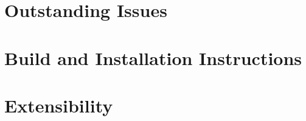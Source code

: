 \documentclass{article}
\begin{document}
\section{Outstanding Issues} %

\section{Build and Installation Instructions}

\section{Extensibility}
\end{document}
